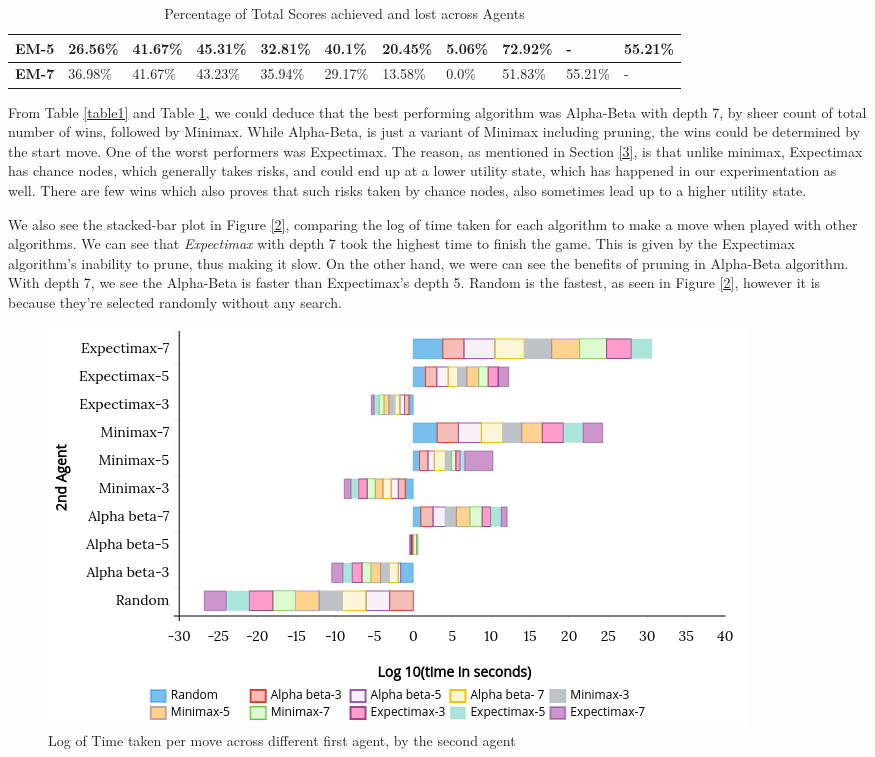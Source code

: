 \documentclass{svproc}
\begin{document}
\begin{table}[H]
{\begin{tabular}{|l|l|l|l|l|l|l|l|l|l|l|}
\textbf{EM-5} & 26.56\%         & 41.67\%               & 45.31\%               & 32.81\%               & 40.1\%             & 20.45\%            & 5.06\%             & 72.92\%               & -                     & 55.21\%               \\ \hline
\textbf{EM-7} & 36.98\%         & 41.67\%               & 43.23\%               & 35.94\%               & 29.17\%            & 13.58\%            & 0.0\%              & 51.83\%               & 55.21\%               & -                     \\ \hline
\end{tabular}%
}

\caption{Percentage of Total Scores achieved and lost across Agents}
\label{table2}
\end{table}

From Table \ref{table1} and Table \ref{table2}, we could deduce that the best performing algorithm was Alpha-Beta with depth 7, by sheer count of total number of wins, followed by Minimax. While Alpha-Beta, is just a variant of Minimax including pruning, the wins could be determined by the start move. One of the worst performers was Expectimax. The reason, as mentioned in Section \ref{3}, is that unlike minimax, Expectimax has chance nodes, which generally takes risks, and could end up at a lower utility state, which has happened in our experimentation as well. There are few wins which also proves that such risks taken by chance nodes, also sometimes lead up to a higher utility state.

We also see the stacked-bar plot in Figure \ref{2}, comparing the log of time taken for each algorithm to make a move when played with other algorithms. We can see that \emph{Expectimax} with depth 7 took the highest time to finish the game. This is given by the Expectimax algorithm's inability to prune, thus making it slow. On the other hand, we were can see the benefits of pruning in Alpha-Beta algorithm. With depth 7, we see the Alpha-Beta is faster than Expectimax's depth 5. Random is the fastest, as seen in Figure \ref{2}, however it is because they're selected randomly without any search.

\begin{figure}
    \centering
    \includegraphics[scale=0.4]{img2.png}
    \caption{Log of Time taken per move across different first agent, by the second agent}
    \label{figure2}
\end{figure}
\end{document}
